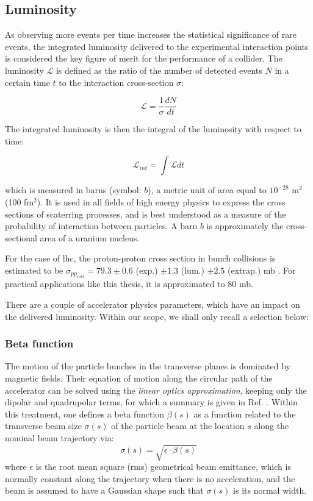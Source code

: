 \documentclass[encoding=utf8,british]{tumphthesis}
\begin{document}
\subsection{Luminosity}

As observing more events per time increases the statistical significance of rare events, the integrated luminosity delivered to the experimental interaction points is considered the key figure of merit for the performance of a collider. The luminosity $\mathcal{L}$ is defined as the ratio of the number of detected events $N$ in a certain time $t$ to the interaction cross-section $\sigma$:

\begin{equation}
    \mathcal{L} = \frac{1}{\sigma} \frac{dN}{dt}
    \label{eq:luminosity-sigma}
\end{equation}

The integrated luminosity is then the integral of the luminosity with respect to time:

\begin{equation}
    \mathcal{L}_{int} = \int \mathcal{L} dt
\end{equation}

which is measured in barns (symbol: $b$), a metric unit of area equal to $10^{-28}$ m$^2$ (100 fm$^2$). It is used in all fields of high energy physics to express the cross sections of scaterring processes, and is best understood as a measure of the probability of interaction between particles. A barn $b$ is approximately the cross-sectional area of a uranium nucleus.

For the case of \acrshort{lhc}, the proton-proton cross section in bunch collisions is estimated to be $\sigma_{pp_{inel}} = 79.3 \pm 0.6$ (exp.) $\pm 1.3$ (lum.) $\pm 2.5$ (extrap.) mb \cite{atlas-crosssection-pp-inelastic}. For practical applications like this thesis, it is approximated to 80 mb.

There are a couple of accelerator physics parameters, which have an impact on the delivered luminosity. Within our scope, we shall only recall a selection below:

\subsubsection{Beta function}

The motion of the particle bunches in the transverse planes is dominated by magnetic fields. Their equation of motion along the circular path of the accelerator can be solved using the \emph{linear optics approximation}, keeping only the dipolar and quadrupolar terms, for which a summary is given in Ref. \cite{Hostettler:2319396}. Within this treatment, one defines a beta function $\beta(s)$ as a function related to the transverse beam size $\sigma(s)$ of the particle beam at the location $s$ along the nominal beam trajectory via:
\begin{equation}
    \sigma(s) = \sqrt{\epsilon \cdot \beta(s)}
\end{equation}
where $\epsilon$ is the root mean square (\acrshort{rms}) geometrical beam emittance, which is normally constant along the trajectory when there is no acceleration, and the beam is assumed to have a Gaussian shape such that $\sigma(s)$ is its normal width.
\end{document}
